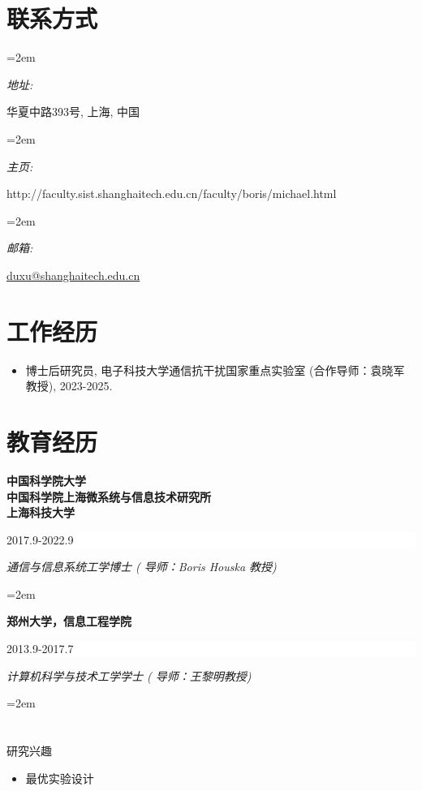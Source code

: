 \documentclass[paper=a4,fontsize=11pt]{scrartcl} %
\newlength{\spacebox}
\newcommand{\sepspace}{\vspace*{1em}}		%
\newcommand{\MyName}[1]{ %
		\Huge \usefont{OT1}{phv}{b}{n} \hfill #1
		\par \normalsize \normalfont}
\newcommand{\MySlogan}[1]{ %
		\large \usefont{OT1}{phv}{m}{n}\hfill \textit{#1}
		\par \normalsize \normalfont}
\newcommand{\NewPart}[1]{\section*{\uppercase{#1}}}
\newcommand{\PersonalEntry}[2]{
		\noindent\hangindent=2em\hangafter=0 %
		\parbox{\spacebox}{        %
		\textit{#1}}		       %
		\hspace{1.5em} #2 \par}    %
\newcommand{\EducationEntry}[4]{
		\noindent \textbf{#1} \hfill      %
		\colorbox{White}{%
			\parbox{5cm}{%
			\hfill\color{Black}#2}} \par  %
		\noindent \textit{#3} \par        %
		\noindent\hangindent=2em\hangafter=0 \small #4 %
		\normalsize \par}
\begin{document}
		\begin{CJK*}{UTF8}{gbsn}
{
	\par \normalsize \normalfont}


\NewPart{联系方式}{}

\PersonalEntry{地址:}{ 华夏中路393号, 上海, 中国}
\PersonalEntry{主页:}{http://faculty.sist.shanghaitech.edu.cn/faculty/boris/michael.html}
\PersonalEntry{邮箱:}{\url{duxu@shanghaitech.edu.cn}}%

\NewPart{工作经历}
\begin{itemize}
	\item 博士后研究员, 电子科技大学通信抗干扰国家重点实验室  (合作导师：袁晓军教授), 2023-2025.
\end{itemize}

\NewPart{教育经历}{}

\EducationEntry{中国科学院大学\\中国科学院上海微系统与信息技术研究所\\上海科技大学}{2017.9-2022.9}{通信与信息系统工学博士 ( 导师：Boris Houska 教授) }

\sepspace

\EducationEntry{郑州大学，信息工程学院}{2013.9-2017.7}{计算机科学与技术工学学士 ( 导师：王黎明教授) }

\NewPart{研究兴趣}{}
\begin{itemize}
	\item{最优实验设计}
	

\end{itemize}
\end{CJK*}
\end{document}
